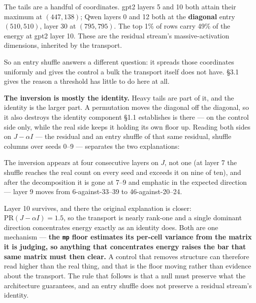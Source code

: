 \documentclass[10pt,letterpaper,twocolumn]{article}
\begin{document}
The tails are a handful of coordinates. gpt2 layers 5 and 10 both attain their maximum at \((447,138)\); Qwen layers 0 and 12 both at the \textbf{diagonal} entry \((510,510)\), layer 30 at \((795,795)\). The top 1\% of rows carry 49\% of the energy at gpt2 layer 10. These are the residual stream's massive-activation dimensions, inherited by the transport.

So an entry shuffle answers a different question: it spreads those coordinates uniformly and gives the control a bulk the transport itself does not have. §3.1 gives the reason a threshold has little to do here at all.

\textbf{The inversion is mostly the identity.} Heavy tails are part of it, and the identity is the larger part. A permutation moves the diagonal off the diagonal, so it also destroys the identity component §1.1 establishes is there --- on the control side only, while the real side keeps it holding its own floor up. Reading both sides on \(J-\alpha I\) --- the residual and an entry shuffle of that same residual, shuffle columns over seeds 0--9 --- separates the two explanations:


The inversion appears at four consecutive layers on \(J\), not one (at layer 7 the shuffle reaches the real count on every seed and exceeds it on nine of ten), and after the decomposition it is gone at 7--9 and emphatic in the expected direction --- layer 9 moves from 6-against-33--39 to 46-against-20--24.

Layer 10 survives, and there the original explanation is closer: \(\mathrm{PR}(J-\alpha I)=1.5\), so the transport is nearly rank-one and a single dominant direction concentrates energy exactly as an identity does. Both are one mechanism --- \textbf{the \texttt{mp} floor estimates its per-cell variance from the matrix it is judging, so anything that concentrates energy raises the bar that same matrix must then clear.} A control that removes structure can therefore read higher than the real thing, and that is the floor moving rather than evidence about the transport. The rule that follows is that a null must preserve what the architecture guarantees, and an entry shuffle does not preserve a residual stream's identity.
\end{document}
